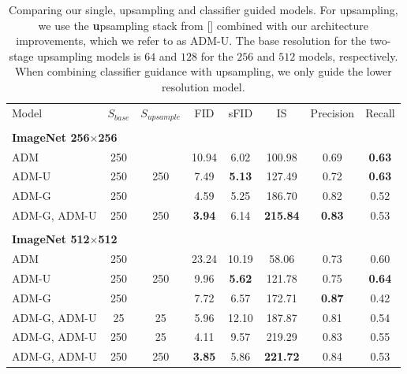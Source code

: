 \documentclass{article}
\newcommand{\namecite}[1]{\citeauthor{#1} [\citenum{#1}]}
\begin{document}
\begin{table}[t]
    \begin{center}
    \begin{small}
    \begin{tabular}{lccccccc}
    \toprule
    Model & $S_{\textit{base}}$ & $S_{\textit{upsample}}$ & FID   & sFID  & IS     & Precision & Recall \\
    \\
    \multicolumn{8}{l}{\bf{ImageNet} 256$\times$256} \\
    \toprule
    ADM & 250 & & 10.94 & 6.02 & 100.98 & 0.69 & \bf{0.63} \\
    ADM-U & 250 & 250 & 7.49 & \bf{5.13} & 127.49 & 0.72 & \bf{0.63} \\
    ADM-G & 250 & & 4.59 & 5.25 & 186.70 & 0.82 & 0.52 \\
    ADM-G, ADM-U & 250 & 250 & \bf{3.94} & 6.14      & \bf{215.84} & \bf{0.83} & 0.53 \\
    \\
    \multicolumn{8}{l}{\bf{ImageNet} 512$\times$512} \\
    \toprule
    ADM & 250   &    & 23.24 &	10.19 & 58.06 & 0.73  & 0.60 \\
    ADM-U & 250 & 250  & 9.96      & \bf{5.62} & 121.78      & 0.75      & \bf{0.64} \\
    ADM-G & 250    &   & 7.72      & 6.57      & 172.71      & \bf{0.87} & 0.42 \\
    ADM-G, ADM-U & 25 & 25    & 5.96      & 12.10     & 187.87      & 0.81      & 0.54 \\
    ADM-G, ADM-U & 250 & 25   & 4.11      & 9.57      & 219.29      & 0.83      & 0.55 \\
    ADM-G, ADM-U & 250 & 250  & \bf{3.85} & 5.86      & \bf{221.72} & 0.84      & 0.53 \\
    \end{tabular}
    \end{small}
    \end{center}
    \caption{Comparing our single, upsampling and classifier guided models. For upsampling, we use the \textbf{u}psampling stack from \namecite{improved} combined with our architecture improvements, which we refer to as ADM-U. The base resolution for the two-stage upsampling models is $64$ and $128$ for the $256$ and $512$ models, respectively. When combining classifier guidance with upsampling, we only guide the lower resolution model.}
    \label{tab:upsample}
    \vskip -0.2in
\end{table}
\end{document}
